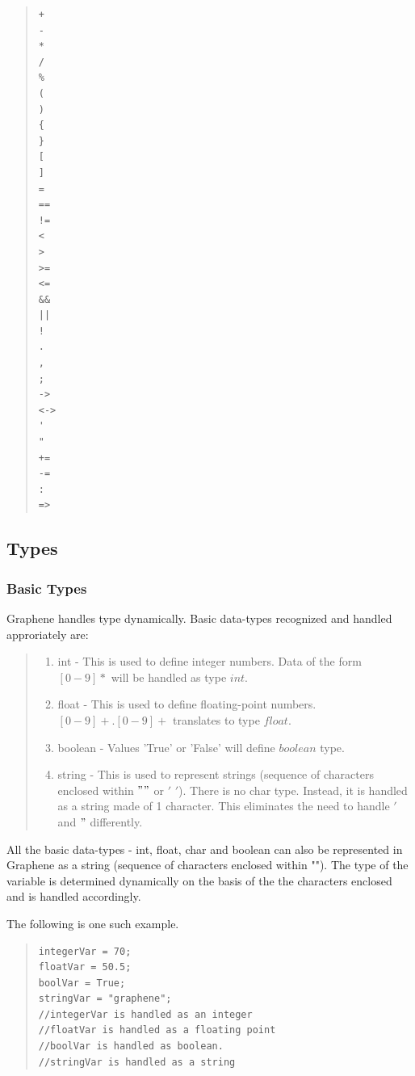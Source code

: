 \documentclass[a4paper]{article}
\begin{document}
\begin{multicols}{5}
\begin{quote}
\begin{verbatim}
+ 	
- 	
*
/	
%
( 	
) 	
{ 	
} 	
[	
]
=
==	
!=	
<	
>	
>=	
<=
&&	
||	
!
.	
,	
;	
->
<->
'
"
+=
-=
:
=>
\end{verbatim}
\end{quote}
\end{multicols}

\subsection{Types}

\subsubsection{Basic Types}
Graphene handles type dynamically. 
Basic data-types recognized and handled approriately are:

\begin{quote}
\begin{enumerate}
\item int - This is used to define integer numbers. Data of the form $[0-9]*$ will be handled as type $int$.
\item float - This is used to define floating-point numbers. $[0-9]+.[0-9]+$ translates to type $float$.
\item boolean - Values 'True' or 'False' will define $boolean$ type.
\item string - This is used to represent strings (sequence of characters enclosed within $""$ or $'$ $'$).
There is no char type. Instead, it is handled as a string made of 1 character. This eliminates the need to handle $'$ and $"$ differently.
\end{enumerate}
\end{quote}
All the basic data-types - int, float, char and boolean can also be represented in Graphene as a string (sequence of characters enclosed within ""). 
\newline
\newline
The type of the variable is determined dynamically on the basis of the the characters enclosed and is handled accordingly. 

The following is one such example.

\begin{multicols}{2}
\begin{quote}
\begin{verbatim}
integerVar = 70;		
floatVar = 50.5;		
boolVar = True;		
stringVar = "graphene";
//integerVar is handled as an integer
//floatVar is handled as a floating point
//boolVar is handled as boolean.
//stringVar is handled as a string
\end{verbatim}
\end{quote}
\end{multicols}
\end{document}
